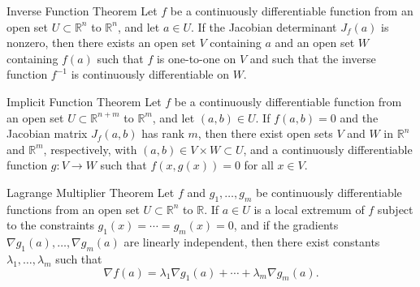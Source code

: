 \documentclass[a4paper]{article}
\newcommand{\reals}{\mathbb{R}}
\begin{document}

\begin{theorem}{Inverse Function Theorem}{}
Let $f$ be a continuously differentiable function from an open set $U \subset \reals^{n}$ to $\reals^{n}$, and let $a \in U$. If the Jacobian determinant $J_{f}(a)$ is nonzero, then there exists an open set $V$ containing $a$ and an open set $W$ containing $f(a)$ such that $f$ is one-to-one on $V$ and such that the inverse function $f^{-1}$ is continuously differentiable on $W$.
\end{theorem}

\begin{theorem}{Implicit Function Theorem}{}
Let $f$ be a continuously differentiable function from an open set $U \subset \reals^{n+m}$ to $\reals^{m}$, and let $(a,b) \in U$. If $f(a,b) = 0$ and the Jacobian matrix $J_{f}(a,b)$ has rank $m$, then there exist open sets $V$ and $W$ in $\reals^{n}$ and $\reals^{m}$, respectively, with $(a,b) \in V \times W \subset U$, and a continuously differentiable function $g: V \to W$ such that $f(x,g(x)) = 0$ for all $x \in V$.
\end{theorem}

\begin{theorem}{Lagrange Multiplier Theorem}{}
Let $f$ and $g_{1}, \ldots, g_{m}$ be continuously differentiable functions from an open set $U \subset \reals^{n}$ to $\reals$. If $a \in U$ is a local extremum of $f$ subject to the constraints $g_{1}(x) = \cdots = g_{m}(x) = 0$, and if the gradients $\nabla g_{1}(a), \ldots, \nabla g_{m}(a)$ are linearly independent, then there exist constants $\lambda_{1}, \ldots, \lambda_{m}$ such that
\begin{equation*}
\nabla f(a) = \lambda_{1} \nabla g_{1}(a) + \cdots + \lambda_{m} \nabla g_{m}(a).
\end{equation*}
\end{theorem}
\end{document}
